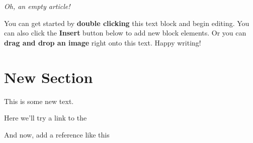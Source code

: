 \documentclass[10pt,a4paper]{article}
\begin{document}
\textit{Oh, an empty article!} 

You can get started by \textbf{double clicking} this text block and begin editing. You can also click the \textbf{Insert} button below to add new block elements. Or you can \textbf{drag and drop an image} right onto this text. Happy writing!

\section{New Section}
\label{sec:newsection}
This is some new text.

Here we'll try a link to the 

And now, add a reference like this \cite{Talus_2015}
\end{document}
